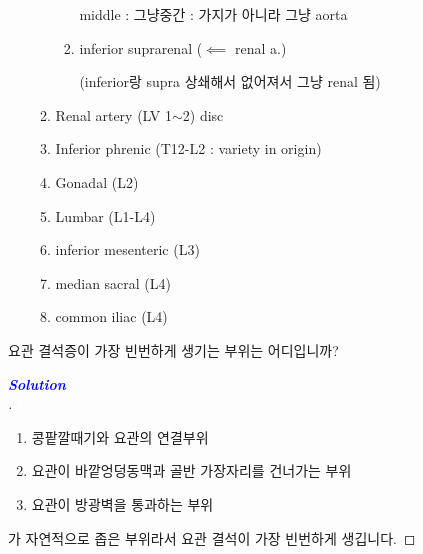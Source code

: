 \documentclass[10pt]{amsart}
\numberwithin{theorem}{section}
\numberwithin{example}{section}
\newenvironment{prob}[1]
  {\renewcommand\theinnercustompro{#1}\innercustompro}
  {\endinnercustompro}
\newenvironment{solution}
  {\begin{proof}[\textbf{\textcolor{blue}{Solution}}\\]}
  {\end{proof}}
\theoremstyle{definition}
\theoremstyle{remark}
\begin{document}
\begin{enumerate}
\begin{enumerate}
\begin{enumerate}
    middle : 그냥중간 : 가지가 아니라 그냥 aorta
    \item inferior suprarenal ($\impliedby $ renal a.)
    
    (inferior랑 supra 상쇄해서 없어져서 그냥 renal 됨) 
    
    
\end{enumerate}

    \vspace{1.5pt}
    
    
    \item 
    
    Renal artery (LV 1$\sim$2) disc
    
    \vspace{1.5pt}
    
    
    \item Inferior phrenic  (T12-L2 : variety in origin)
    
\item   Gonadal (L2) 

\item  Lumbar (L1-L4)

\item inferior mesenteric (L3)

\item  median sacral (L4)

\item common iliac (L4) 
    \end{enumerate}
\end{enumerate}

\vspace{2pt}




\newpage
\begin{prob}{1}
\textnormal{요관 결석증이 가장 빈번하게 생기는 부위는 어디입니까?}

\end{prob}

\begin{solution}

\textcolor{white}{124}

\begin{enumerate}
    \item 콩팥깔때기와 요관의 연결부위
    \item 요관이 바깥엉덩동맥과 골반 가장자리를 건너가는 부위
    \item 요관이 방광벽을 통과하는 부위
    
\end{enumerate}

가 자연적으로 좁은 부위라서 요관 결석이 가장 빈번하게 생깁니다.
\end{solution}
\end{document}
